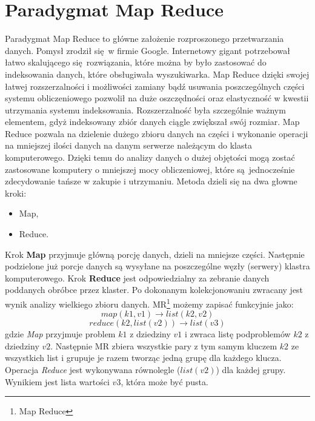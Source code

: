\section{Paradygmat Map Reduce}
Paradygmat Map Reduce to główne założenie rozproszonego przetwarzania danych. Pomysł zrodził się w firmie Google. Internetowy gigant potrzebował łatwo skalującego się rozwiązania, które można by było zastosować do indeksowania danych, które obsługiwała wyszukiwarka. Map Reduce dzięki swojej łatwej rozszerzalności i możliwości zamiany bądź usuwania poszczególnych części systemu obliczeniowego pozwolił na duże oszczędności oraz elastyczność w kwestii utrzymania systemu indeksowania. Rozszerzalność była szczególnie ważnym elementem, gdyż indeksowany zbiór danych ciągle zwiększał swój rozmiar.
\newline
Map Reduce pozwala na dzielenie dużego zbioru danych na części i wykonanie operacji na mniejszej ilości danych na danym serwerze należącym do klasta komputerowego. Dzięki temu do analizy danych o dużej objętości mogą zostać zastosowane komputery o mniejszej mocy obliczeniowej, które są jednocześnie zdecydowanie tańsze w zakupie i utrzymaniu. Metoda dzieli się na dwa głowne kroki:
\begin{itemize}
	\item Map,
	\item Reduce. 
\end{itemize}
Krok \textbf{Map} przyjmuje główną porcję danych, dzieli na mniejsze części. Następnie podzielone już porcje danych są wysyłane na poszczególne węzły (serwery) klastra komputerowego. Krok \textbf{Reduce} jest odpowiedzialny za zebranie danych poddanych obróbce przez klaster. Po dokonanym kolekcjonowaniu zwracany jest wynik analizy wielkiego zbioru danych\cite{map_reduce_description}.
\newline MR\footnote{Map Reduce} możemy zapisać funkcyjnie jako:
\begin{equation}
map(k1,v1) \to list(k2,v2)
\end{equation}
\begin{equation}
reduce(k2, list (v2)) \to list (v3)
\end{equation}
gdzie \textit{Map} przyjmuje problem $k1$ z dziedziny $v1$ i zwraca listę podproblemów $k2$ z dziedziny $v2$. Następnie MR zbiera wszystkie pary z tym samym kluczem $k2$ ze wszystkich list i grupuje je razem tworząc jedną grupę dla każdego klucza. Operacja \textit{Reduce} jest wykonywana równolegle ($list(v2)$) dla każdej grupy. Wynikiem jest lista wartości $v3$, która może być pusta\cite{map_reduce_microsoft_article}.
